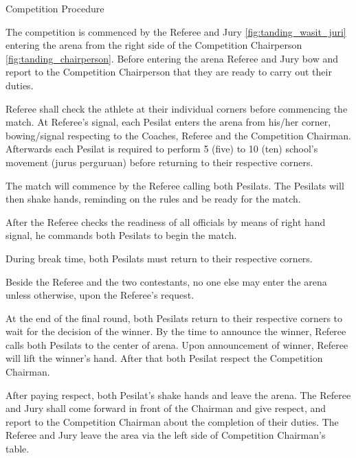 \begin{legal}
\item Competition Procedure
    \begin{legal}
    \item The competition is commenced by the Referee and Jury \ref{fig:tanding_wasit_juri} 
    entering the arena from the
    right side of the Competition Chairperson \ref{fig:tanding_chairperson}. 
    Before entering the arena Referee and Jury bow and report to the 
    Competition Chairperson that they are ready to carry out their duties.
    \item Referee shall check the athlete at their individual corners before commencing the
    match. At Referee’s signal, each Pesilat enters the arena from his/her corner,
    bowing/signal respecting to the Coaches, Referee and the Competition Chairman. Afterwards each
    Pesilat is required to perform 5 (five) to 10 (ten) school’s movement (jurus
    perguruan) before returning to their respective corners.
    \item The match will commence by the Referee calling both Pesilats. The Pesilats will then
shake hands, reminding on the rules and be ready for the match.
    \item After the Referee checks the readiness of all officials by means of right hand signal,
he commands both Pesilats to begin the match.
    \item During break time, both Pesilats must return to their respective corners.
    \item Beside the Referee and the two contestants, no one else may enter the arena unless
otherwise, upon the Referee’s request.
    \item At the end of the final round, both Pesilats return to their respective corners to wait
for the decision of the winner. By the time to announce the winner, Referee calls both
Pesilats to the center of arena. Upon announcement of winner, Referee will lift the
winner’s hand. After that both Pesilat respect the Competition Chairman.
    \item After paying respect, both Pesilat’s shake hands and leave the arena. The Referee and
Jury shall come forward in front of the Chairman and give respect, and report to the
Competition Chairman about the completion of their duties. The Referee and Jury
leave the area via the left side of Competition Chairman’s table.
    \end{legal}


\end{legal}
